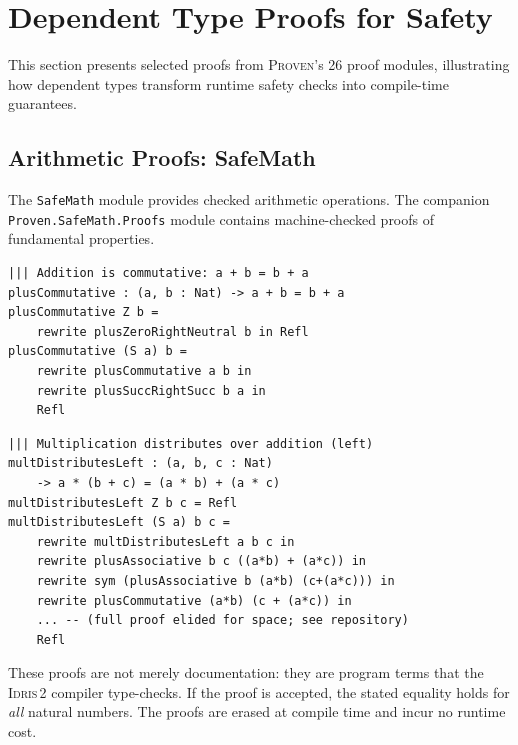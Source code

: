 \documentclass[11pt,a4paper]{article}
\newcommand{\proven}{\textsc{Proven}}
\newcommand{\idris}{\textsc{Idris\,2}}
\newcommand{\safe}[1]{\texttt{Safe#1}}
\newcommand{\code}[1]{\texttt{#1}}
\begin{document}
\section{Dependent Type Proofs for Safety}
\label{sec:proofs}

This section presents selected proofs from \proven{}'s 26 proof modules,
illustrating how dependent types transform runtime safety checks into
compile-time guarantees.

\subsection{Arithmetic Proofs: SafeMath}
\label{sec:proof-math}

The \safe{Math} module provides checked arithmetic operations. The
companion \code{Proven.SafeMath.Proofs} module contains machine-checked
proofs of fundamental properties.

\begin{lstlisting}[language=Idris2, caption={Machine-checked proof of
addition commutativity from \code{Proven.SafeMath.Proofs}. The proof
proceeds by induction on the first argument, using lemmas from the
standard library.}, label=lst:plus-comm]
||| Addition is commutative: a + b = b + a
plusCommutative : (a, b : Nat) -> a + b = b + a
plusCommutative Z b =
    rewrite plusZeroRightNeutral b in Refl
plusCommutative (S a) b =
    rewrite plusCommutative a b in
    rewrite plusSuccRightSucc b a in
    Refl
\end{lstlisting}

\begin{lstlisting}[language=Idris2, caption={Multiplication distributes
over addition, proven by structural induction with associativity and
commutativity rewrites.}, label=lst:mult-dist]
||| Multiplication distributes over addition (left)
multDistributesLeft : (a, b, c : Nat)
    -> a * (b + c) = (a * b) + (a * c)
multDistributesLeft Z b c = Refl
multDistributesLeft (S a) b c =
    rewrite multDistributesLeft a b c in
    rewrite plusAssociative b c ((a*b) + (a*c)) in
    rewrite sym (plusAssociative b (a*b) (c+(a*c))) in
    rewrite plusCommutative (a*b) (c + (a*c)) in
    ... -- (full proof elided for space; see repository)
    Refl
\end{lstlisting}

These proofs are not merely documentation: they are program terms that
the \idris{} compiler type-checks. If the proof is accepted, the stated
equality holds for \emph{all} natural numbers. The proofs are erased at
compile time and incur no runtime cost.
\end{document}
